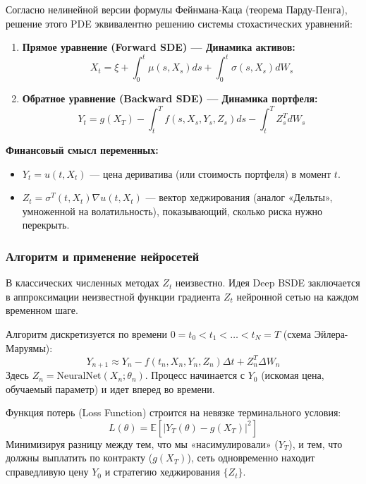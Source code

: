 Согласно нелинейной версии формулы Фейнмана-Каца (теорема Парду-Пенга), решение этого PDE эквивалентно решению системы стохастических уравнений:

\begin{enumerate}
    \item \textbf{Прямое уравнение (Forward SDE) — Динамика активов:}
    \begin{equation}
        X_t = \xi + \int_{0}^{t} \mu(s, X_s) ds + \int_{0}^{t} \sigma(s, X_s) dW_s
    \end{equation}
    \item \textbf{Обратное уравнение (Backward SDE) — Динамика портфеля:}
    \begin{equation}
        Y_t = g(X_T) - \int_{t}^{T} f(s, X_s, Y_s, Z_s) ds - \int_{t}^{T} Z_s^T dW_s
    \end{equation}
\end{enumerate}

\textbf{Финансовый смысл переменных:}
\begin{itemize}
    \item $Y_t = u(t, X_t)$ — цена дериватива (или стоимость портфеля) в момент $t$.
    \item $Z_t = \sigma^T(t, X_t) \nabla u(t, X_t)$ — вектор хеджирования (аналог «Дельты», умноженной на волатильность), показывающий, сколько риска нужно перекрыть.
\end{itemize}

\subsubsection{Алгоритм и применение нейросетей}
В классических численных методах $Z_t$ неизвестно. Идея Deep BSDE заключается в аппроксимации неизвестной функции градиента $Z_t$ нейронной сетью на каждом временном шаге.

Алгоритм дискретизуется по времени $0 = t_0 < t_1 < \dots < t_N = T$ (схема Эйлера-Маруямы):
\begin{equation}
    Y_{n+1} \approx Y_n - f(t_n, X_n, Y_n, Z_n)\Delta t + Z_n^T \Delta W_n
\end{equation}
Здесь $Z_n = \text{NeuralNet}(X_n; \theta_n)$.
Процесс начинается с $Y_0$ (искомая цена, обучаемый параметр) и идет вперед во времени.

Функция потерь (Loss Function) строится на невязке терминального условия:
\begin{equation}
    L(\theta) = \mathbb{E} \left[ | Y_T(\theta) - g(X_T) |^2 \right]
\end{equation}
Минимизируя разницу между тем, что мы «насимулировали» ($Y_T$), и тем, что должны выплатить по контракту ($g(X_T)$), сеть одновременно находит справедливую цену $Y_0$ и стратегию хеджирования $\{Z_t\}$.

